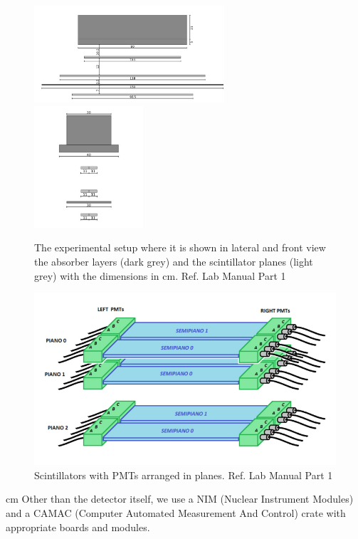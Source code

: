 	\begin{figure}
		\centering
		\includegraphics[width=0.63\textwidth]{figures/11.png}
		\includegraphics[width=0.36\textwidth]{figures/22.png}
		\caption{The experimental setup where it is shown in lateral and front view the absorber layers (dark grey) and the scintillator planes (light grey) with the dimensions in cm. Ref. Lab Manual Part 1}
		\label{fig:Scintillators_Detectors}
	\end{figure}
	\begin{figure}
		\centering
		\includegraphics[width=1\textwidth]{figures/33.png}
		\caption{Scintillators with PMTs arranged in planes. Ref. Lab Manual Part 1}
		\label{fig:Setup}
	\end{figure}
	 cm
	Other than the detector itself, we use a NIM (Nuclear Instrument Modules) and a 
    CAMAC (Computer Automated Measurement And Control) crate with appropriate boards and modules.
